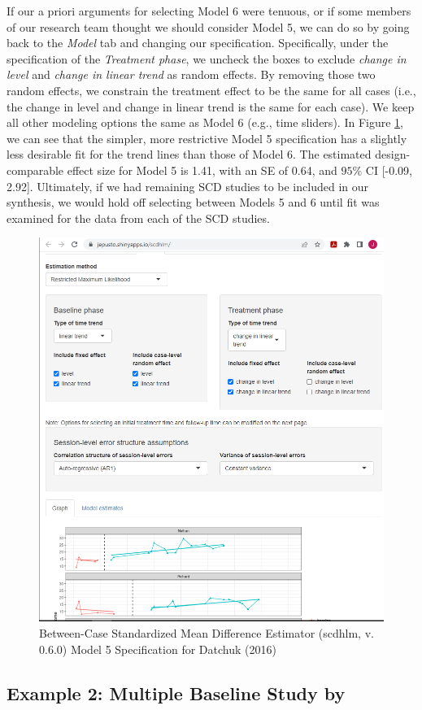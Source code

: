 \documentclass[
]{book}
\begin{document}
If our a priori arguments for selecting Model 6 were tenuous, or if some members of our research team thought we should consider Model 5, we can do so by going back to the \emph{Model} tab and changing our specification. Specifically, under the specification of the \emph{Treatment phase}, we uncheck the boxes to exclude \emph{change in level} and \emph{change in linear trend} as random effects. By removing those two random effects, we constrain the treatment effect to be the same for all cases (i.e., the change in level and change in linear trend is the same for each case). We keep all other modeling options the same as Model 6 (e.g., time sliders). In Figure \ref{fig:Datchuk-2016-model5}, we can see that the simpler, more restrictive Model 5 specification has a slightly less desirable fit for the trend lines than those of Model 6. The estimated design-comparable effect size for Model 5 is 1.41, with an SE of 0.64, and \(95\%\) CI {[}-0.09, 2.92{]}. Ultimately, if we had remaining SCD studies to be included in our synthesis, we would hold off selecting between Models 5 and 6 until fit was examined for the data from each of the SCD studies.

\begin{figure}
\includegraphics[width=0.6\linewidth]{images/app.model.model5_Datchuk2016} \caption{Between-Case Standardized Mean Difference Estimator (scdhlm, v. 0.6.0) Model 5 Specification for Datchuk (2016)}\label{fig:Datchuk-2016-model5}
\end{figure}

\hypertarget{example-2-multiple-baseline-study-by-rodgers2021effects}{%
\subsection{\texorpdfstring{Example 2: Multiple Baseline Study by \citet{rodgers2021Effects}}{Example 2: Multiple Baseline Study by @rodgers2021Effects}}\label{example-2-multiple-baseline-study-by-rodgers2021effects}}
\end{document}

